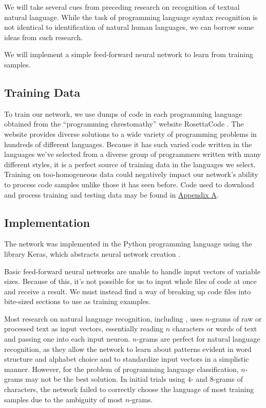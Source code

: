 \documentclass{article}
\begin{document}
We will take several cues from preceding research on recognition of textual natural language. While the task of programming language syntax recognition is not identical to identification of natural human languages, we can borrow some ideas from such research.

We will implement a simple feed-forward neural network to learn from training samples.

\subsection{Training Data}
To train our network, we use dumps of code in each programming language obtained from the ``programming chrestomathy'' website RosettaCode \cite{rosettacode}. The website provides diverse solutions to a wide variety of programming problems in hundreds of different languages. Because it has such varied code written in the languages we've selected from a diverse group of programmers written with many different styles, it is a perfect source of training data in the languages we select. Training on too-homogeneous data could negatively impact our network's ability to process code samples unlike those it has seen before. Code used to download and process training and testing data may be found in  \hyperref[sec:appendix_a]{Appendix A}.
\subsection{Implementation}
The network was implemented in the Python programming language using the library Keras, which abstracts neural network creation \cite{keras}.

Basic feed-forward neural networks are unable to handle input vectors of variable sizes. Because of this, it's not possible for us to input whole files of code at once and receive a result. We must instead find a way of breaking up code files into bite-sized sections to use as training examples.

Most research on natural language recognition, including \cite{langidstanford}, uses $n$-grams of raw or processed text as input vectors, essentially reading $n$ characters or words of text and passing one into each input neuron. $n$-grams are perfect for natural language recognition, as they allow the network to learn about patterns evident in word structure and alphabet choice and to standardize input vectors in a simplistic manner. However, for the problem of programming language classification, $n$-grams may not be the best solution. In initial trials using $4$- and $8$-grams of characters, the network failed to correctly choose the language of most training samples due to the ambiguity of most $n$-grams.
\end{document}
